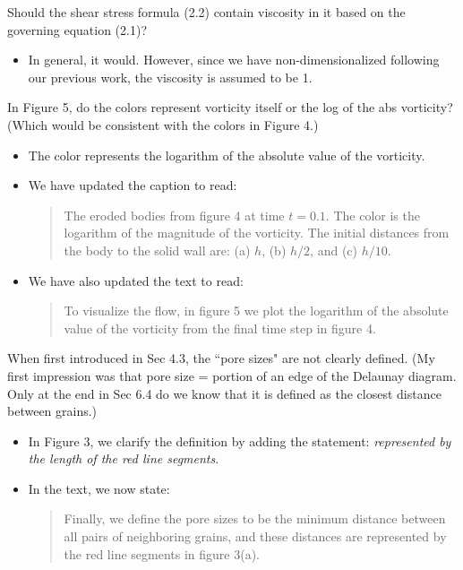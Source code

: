 \documentclass[11pt]{article}
\newcommand{\comment}[1]{{\color{blue} #1}}
\begin{document}
\noindent
\comment{Should the shear stress formula (2.2) contain viscosity in it
based on the governing equation (2.1)?}
\begin{itemize}
  \item In general, it would. However, since we have non-dimensionalized
    following our previous work, the viscosity is assumed to be 1.
\end{itemize}

\noindent
\comment{In Figure 5, do the colors represent vorticity itself or the
log of the abs vorticity? (Which would be consistent with the colors in
Figure 4.)}
\begin{itemize}
  \item The color represents the logarithm of the absolute value of the
    vorticity.
  \item We have updated the caption to read:
    \begin{quotation}
    \noindent
      The eroded bodies from figure 4 at time $t = 0.1$. The color is
      the logarithm of the magnitude of the vorticity. The initial
      distances from the body to the solid wall are: (a) $h$, (b) $h/2$,
      and (c) $h/10$.
    \end{quotation}
  \item We have also updated the text to read:
    \begin{quotation}
    \noindent
      To visualize the flow, in figure 5 we plot the logarithm of the
      absolute value of the vorticity from the final time step in figure
      4.
    \end{quotation}
\end{itemize}

\noindent
\comment{When first introduced in Sec 4.3, the ``pore sizes" are not
clearly defined. (My first impression was that pore size = portion of an
edge of the Delaunay diagram. Only at the end in Sec 6.4 do we know that
it is defined as the closest distance between grains.)}
\begin{itemize}
  \item In Figure 3, we clarify the definition by adding the statement:
    {\em represented by the length of the red line segments}.
  \item In the text, we now state:
    \begin{quotation}
    \noindent
      Finally, we define the pore sizes to be the minimum distance
      between all pairs of neighboring grains, and these distances are
      represented by the red line segments in figure 3(a).
    \end{quotation}
\end{itemize}
\end{document}
